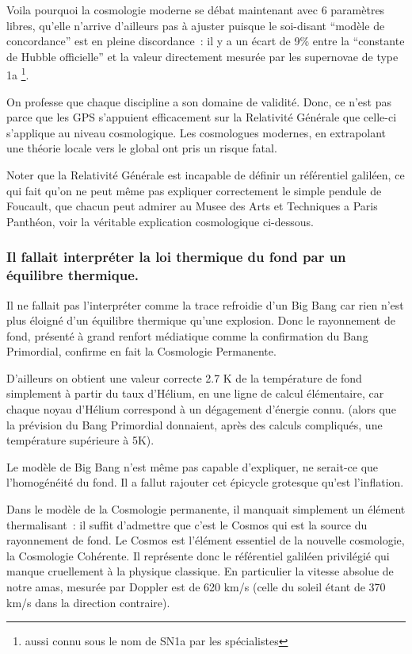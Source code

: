 \documentclass[a4paper,12pt]{article}
\begin{document}
Voila pourquoi la cosmologie moderne se débat maintenant avec 6 paramètres libres, qu'elle n'arrive d'ailleurs pas à ajuster puisque le soi-disant ``modèle de concordance'' est en pleine discordance : il y a un écart de 9\% entre la ``constante de Hubble officielle'' et la valeur directement mesurée par les supernovae de type 1a \footnote{aussi connu sous le nom de SN1a par les spécialistes}.


    On professe que chaque discipline a son domaine de validité. Donc, ce n'est pas parce que les GPS s'appuient efficacement sur la Relativité Générale que celle-ci s'applique au niveau cosmologique. Les cosmologues modernes, en extrapolant une théorie locale vers le global ont pris un risque fatal. 

Noter que la Relativité Générale est incapable de définir un référentiel galiléen, ce qui fait qu'on ne peut m\^eme pas expliquer correctement le simple pendule de Foucault, que chacun peut admirer au Musee des Arts et Techniques a Paris Panthéon, voir la véritable explication cosmologique ci-dessous.

    
\subsubsection{Il fallait interpréter la loi thermique du fond par un équilibre thermique.}


Il ne fallait pas l’interpréter comme la trace refroidie d'un Big Bang car rien n'est plus éloigné d'un équilibre thermique qu'une explosion. Donc le rayonnement de fond, présenté à grand renfort médiatique comme la confirmation du Bang Primordial, confirme en fait la Cosmologie Permanente. 


D'ailleurs on obtient une valeur correcte 2.7 K de la température de fond simplement à partir du taux d'Hélium, en une ligne de calcul élémentaire, car chaque noyau d'Hélium correspond à un dégagement d'énergie connu. (alors que la prévision du Bang Primordial donnaient, après des calculs compliqués, une température supérieure à 5K).  


Le modèle de Big Bang n’est m\^eme pas capable d’expliquer, ne serait-ce que l'homogénéité du fond.  Il a fallut rajouter cet épicycle grotesque qu'est l'inflation. 


    Dans le modèle de la Cosmologie permanente, il manquait simplement un élément thermalisant : il suffit d'admettre que c'est le Cosmos qui est la source du rayonnement de fond. Le Cosmos est l'élément essentiel de la nouvelle cosmologie, la Cosmologie Cohérente. Il représente donc le référentiel galiléen privilégié qui manque cruellement à la physique classique. En particulier la vitesse absolue de notre amas, mesurée par Doppler est de 620 km/s (celle du soleil étant de 370 km/s dans la direction contraire).
\end{document}
